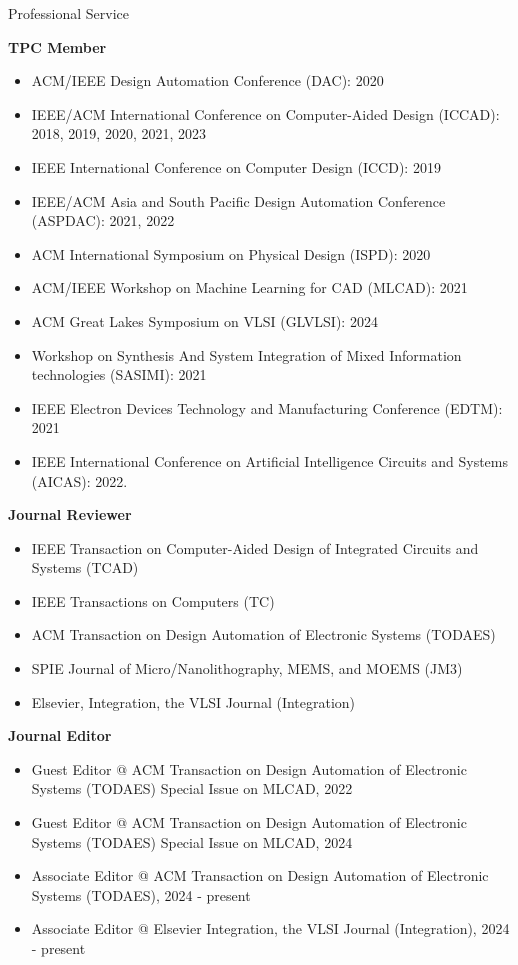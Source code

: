 
\begin{rSection}{Professional Service}

\textbf{TPC Member}
\begin{itemize}
    \item ACM/IEEE Design Automation Conference (DAC): 2020
    \item IEEE/ACM International Conference on Computer-Aided Design (ICCAD): 2018, 2019, 2020, 2021, 2023
    \item IEEE International Conference on Computer Design (ICCD): 2019
    \item IEEE/ACM Asia and South Pacific Design Automation Conference (ASPDAC): 2021, 2022
    \item ACM International Symposium on Physical Design (ISPD): 2020
    \item ACM/IEEE Workshop on Machine Learning for CAD (MLCAD): 2021
    \item ACM Great Lakes Symposium on VLSI (GLVLSI): 2024
    \item Workshop on Synthesis And System Integration of Mixed Information technologies (SASIMI): 2021
    \item IEEE Electron Devices Technology and Manufacturing Conference (EDTM): 2021
    \item IEEE International Conference on Artificial Intelligence Circuits and Systems (AICAS): 2022. 
\end{itemize}

\textbf{Journal Reviewer}
\begin{itemize}
    \item IEEE Transaction on Computer-Aided Design of Integrated Circuits and Systems (TCAD)
    \item IEEE Transactions on Computers (TC)
    \item ACM Transaction on Design Automation of Electronic Systems (TODAES)
    \item SPIE Journal of Micro/Nanolithography, MEMS, and MOEMS (JM3)
    \item Elsevier, Integration, the VLSI Journal (Integration)
\end{itemize}

\textbf{Journal Editor}
\begin{itemize}
    \item Guest Editor @ ACM Transaction on Design Automation of Electronic Systems (TODAES) Special Issue on MLCAD, 2022
    \item Guest Editor @ ACM Transaction on Design Automation of Electronic Systems (TODAES) Special Issue on MLCAD, 2024
    \item Associate Editor @ ACM Transaction on Design Automation of Electronic Systems (TODAES), 2024 - present
    \item Associate Editor @ Elsevier Integration, the VLSI Journal (Integration), 2024 - present
\end{itemize}


\end{rSection}
